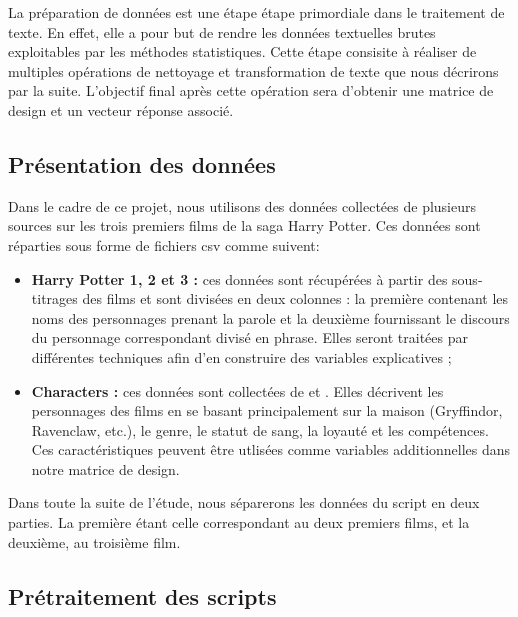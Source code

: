 \documentclass[11pt]{article}
\begin{document}
\begin{center}
La préparation de données est une étape étape primordiale dans le traitement de texte. En effet, elle a pour but de rendre les données textuelles brutes exploitables par les méthodes statistiques. Cette étape consisite à réaliser de multiples opérations de nettoyage et transformation de texte que nous décrirons par la suite. L'objectif final après cette opération sera d'obtenir une matrice de design et un vecteur réponse associé.\par

\subsection{Présentation des données}

Dans le cadre de ce projet, nous utilisons des données collectées de plusieurs sources sur les trois premiers films de la saga Harry Potter. Ces données sont réparties sous forme de fichiers csv comme suivent:

\begin{itemize}
    \renewcommand{\labelitemi}{$\bullet$}
    \item \textbf{Harry Potter 1, 2 et 3 :} ces données sont récupérées à partir des sous-titrages des films et sont divisées en deux colonnes : la première contenant les noms des personnages prenant la parole et la deuxième fournissant le discours du personnage correspondant divisé en phrase.
    Elles seront traitées par différentes techniques afin d'en construire des variables explicatives ;
    
    \item \textbf{Characters :} ces données sont collectées de \cite{1} et \cite{2}. Elles décrivent les personnages des films en se basant principalement sur la maison (Gryffindor, Ravenclaw, etc.), le genre, le statut de sang, la loyauté et les compétences. Ces caractéristiques peuvent être utlisées comme variables additionnelles dans notre matrice de design.
\end{itemize}

Dans toute la suite de l'étude, nous séparerons les données du script en deux parties. La première étant celle correspondant au deux premiers films, et la deuxième, au troisième film.

\subsection{Prétraitement des scripts}


\end{center}
\end{document}
